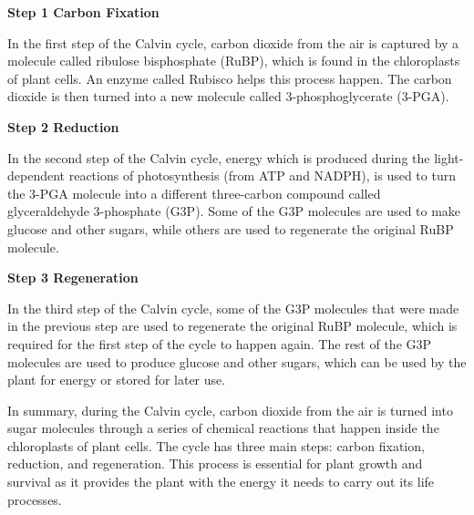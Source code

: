 \documentclass{article}
\begin{document}
{            \textbf{Step 1 Carbon Fixation} \par
            \vspace*{1\baselineskip}
            In the first step of the Calvin cycle, carbon dioxide from the air is captured by a molecule called ribulose bisphosphate (RuBP), which is found in the chloroplasts of plant cells. An enzyme called Rubisco helps this process happen. The carbon dioxide is then turned into a new molecule called 3-phosphoglycerate (3-PGA).\par
            \vspace*{1\baselineskip}
            \textbf{Step 2 Reduction}\par
            \vspace*{1\baselineskip}
            In the second step of the Calvin cycle, energy which is produced during the light-dependent reactions of photosynthesis (from ATP and NADPH), is used to turn the 3-PGA molecule into a different three-carbon compound called glyceraldehyde 3-phosphate (G3P). Some of the G3P molecules are used to make glucose and other sugars, while others are used to regenerate the original RuBP molecule.\par
            \vspace*{1\baselineskip}
            \textbf{Step 3 Regeneration}\par
            \vspace*{1\baselineskip}
            In the third step of the Calvin cycle, some of the G3P molecules that were made in the previous step are used to regenerate the original RuBP molecule, which is required for the first step of the cycle to happen again. The rest of the G3P molecules are used to produce glucose and other sugars, which can be used by the plant for energy or stored for later use.\par
            \vspace*{1\baselineskip}
            In summary, during the Calvin cycle, carbon dioxide from the air is turned into sugar molecules through a series of chemical reactions that happen inside the chloroplasts of plant cells. The cycle has three main steps: carbon fixation, reduction, and regeneration. This process is essential for plant growth and survival as it provides the plant with the energy it needs to carry out its life processes.\cite{taiz2010}\par
            \vspace*{4\baselineskip}
            
}
\end{document}
